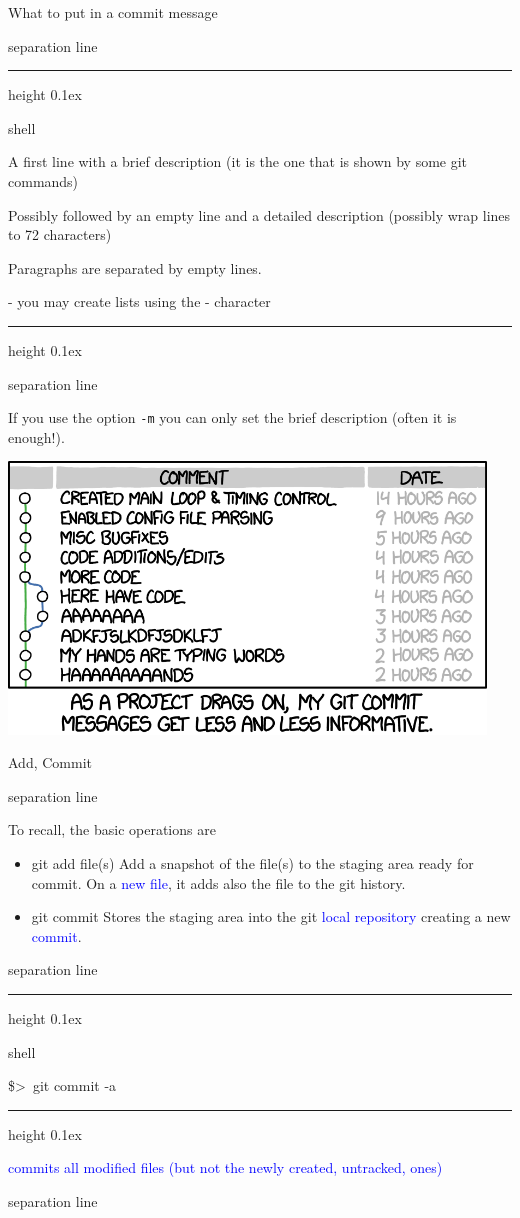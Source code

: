 \documentclass[hyperref={colorlinks}]{beamer}
\newenvironment{shell}{%
\footnotesize\flushleft\hrule height 0.1ex
\tt\begin{beamercolorbox}[sep=1ex,left]{shell}%
}{%
\end{beamercolorbox}
\hrule height 0.1ex
\endflushleft\par
}
\newcommand*{\psone}[1][ant]{\$>~}
\newcommand{\titleline}[1][0.025cm]{%
\begin{beamercolorbox}[wd=\paperwidth,ht=#1,center]{separation line}%
\end{beamercolorbox}%
}
\begin{document}
\begin{frame}{What to put in a commit message}
\titleline
\begin{shell}
A first line with a brief description (it is the one that is shown by some git commands)\\
\vspace{0.3cm}

Possibly followed by an empty line and a detailed description (possibly wrap lines to 72 characters)\\
\vspace{0.3cm}
 
Paragraphs are separated by empty lines.\\
\vspace{0.3cm}
 
- you may create lists using the - character
\end{shell}
\titleline
If you use the option \texttt{-m} \alert{you can only set the brief description} (often it is enough!).
\end{frame}

\begin{frame}{}
  \centering
  \includegraphics[width=0.95\textwidth]{figures/git_commit_2x.png}
\end{frame}

\begin{frame}{Add, Commit}
  \vspace*{-0.3cm}
\titleline
To recall, the basic operations are
\begin{itemize}
\item \alert{git add file(s)} Add a snapshot of the file(s) to the staging area ready for commit. On a \textcolor{blue}{new file}, it adds also the file to the git history.
\item \alert{git commit} Stores the staging area into the git \textcolor{blue}{local repository} creating a new \textcolor{blue}{commit}.
\end{itemize}
\titleline

\begin{shell}
\psone git commit -a 
\end{shell}
\textcolor{blue}{commits all modified files (but not the newly created, untracked, ones)}
\titleline
\end{frame}
\end{document}
